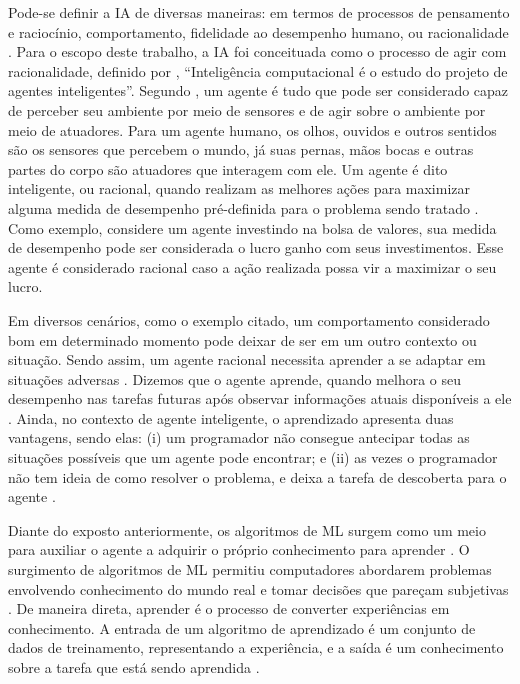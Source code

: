 Pode-se definir a \acrshort{IA} de diversas maneiras: em termos de processos de pensamento e raciocínio, comportamento, fidelidade ao desempenho humano, ou racionalidade \cite{modern_approach}. Para o escopo deste trabalho, a \acrshort{IA} foi conceituada como o processo de agir com racionalidade, definido por \textcite{poole1998computational}, ``Inteligência computacional é o estudo do projeto de agentes inteligentes''. Segundo \textcite{modern_approach}, um agente é tudo que pode ser considerado capaz de perceber seu ambiente por meio de sensores e de agir sobre o ambiente por meio de atuadores. Para um agente humano, os olhos, ouvidos e outros sentidos são os sensores que percebem o mundo, já suas pernas, mãos bocas e outras partes do corpo são atuadores que interagem com ele. Um agente é dito inteligente, ou racional, quando realizam as melhores ações para maximizar alguma medida de desempenho pré-definida para o problema sendo tratado \cite{modern_approach}. Como exemplo, considere um agente investindo na bolsa de valores, sua medida de desempenho pode ser considerada o lucro ganho com seus investimentos. Esse agente é considerado racional caso a ação realizada possa vir a maximizar o seu lucro.

Em diversos cenários, como o exemplo citado, um comportamento considerado bom em determinado momento pode deixar de ser em um outro contexto ou situação. Sendo assim, um agente racional necessita aprender a se adaptar em situações adversas \cite{modern_approach}. Dizemos que o agente aprende, quando melhora o seu desempenho nas tarefas futuras após observar informações atuais disponíveis a ele \cite{modern_approach}. Ainda, no contexto de agente inteligente, o aprendizado apresenta duas vantagens, sendo elas: (i) um programador não consegue antecipar todas as situações possíveis que um agente pode encontrar; e (ii) as vezes o programador não tem ideia de como resolver o problema, e deixa a tarefa de descoberta para o agente \cite{modern_approach}.

Diante do exposto anteriormente, os algoritmos de \acrfull{ML} surgem como um meio para auxiliar o agente a adquirir o próprio conhecimento para aprender \cite{machinelearning}. O surgimento de algoritmos de \acrshort{ML} permitiu computadores abordarem problemas envolvendo conhecimento do mundo real e tomar decisões que pareçam subjetivas \cite{deep_learning}. De maneira direta, aprender é o processo de converter experiências em conhecimento. A entrada de um algoritmo de aprendizado 
é um conjunto de dados de treinamento, representando a experiência, e a saída é um conhecimento sobre a tarefa que está sendo aprendida \cite{shalev2014understanding}.

